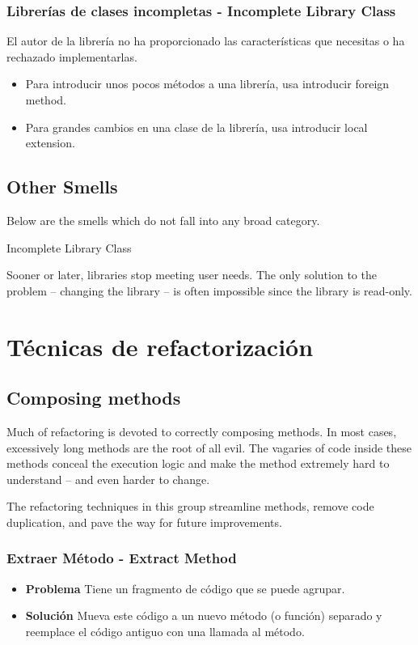 \documentclass[11pt,a4paper,oneside]{book}
\begin{document}
\subsection{Librerías de clases incompletas - Incomplete Library Class}
\label{incompletelibraryclass}
El autor de la librería no ha proporcionado las características que necesitas o ha rechazado implementarlas.
\begin{itemize}
    \item Para introducir unos pocos métodos a una librería, usa introducir foreign method.
    \item Para grandes cambios en una clase de la librería, usa introducir local extension.
\end{itemize}


\section{Other Smells}

Below are the smells which do not fall into any broad category.

Incomplete Library Class

Sooner or later, libraries stop meeting user needs. The only solution to the problem – changing the library – is often impossible since the library is read-only.



\chapter{Técnicas de refactorización}


\section{Composing methods}

Much of refactoring is devoted to correctly composing methods. In most cases, excessively long methods are the root of all evil. The vagaries of code inside these methods conceal the execution logic and make the method extremely hard to understand – and even harder to change.

The refactoring techniques in this group streamline methods, remove code duplication, and pave the way for future improvements.

\subsection{Extraer Método  - Extract Method}
\label{extractmethod}
\begin{itemize}
    \item \textbf{Problema} Tiene un fragmento de código que se puede agrupar.
    \item \textbf{Solución} Mueva este código a un nuevo método (o función) separado y reemplace el código antiguo con una llamada al método.
\end{itemize}


    
\end{document}
